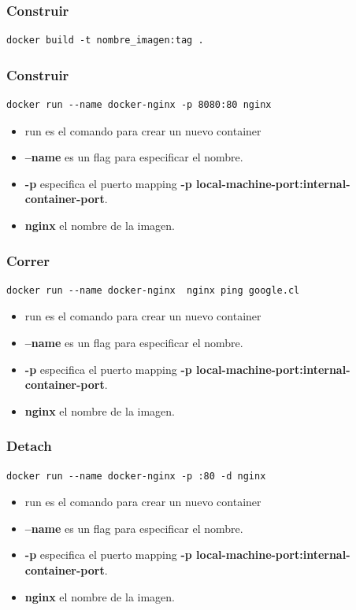 \documentclass[compress]{beamer}
\begin{document}
\begin{frame}[fragile]
\frametitle{Construir}
\begin{lstlisting}
docker build -t nombre_imagen:tag .
\end{lstlisting}
\end{frame}

\begin{frame}[fragile]
\frametitle{Construir}
\begin{lstlisting}
docker run --name docker-nginx -p 8080:80 nginx
\end{lstlisting}
\begin{itemize}
	\item run es el comando para crear un nuevo container
	\item \textbf{--name} es un flag para especificar el nombre.
	\item \textbf{-p} especifica el puerto mapping \textbf{-p local-machine-port:internal-container-port}.
	\item \textbf{nginx} el nombre de la imagen.
\end{itemize}
\end{frame}


\begin{frame}[fragile]
\frametitle{Correr}
\begin{lstlisting}
docker run --name docker-nginx  nginx ping google.cl
\end{lstlisting}
\begin{itemize}
	\item run es el comando para crear un nuevo container
	\item \textbf{--name} es un flag para especificar el nombre.
	\item \textbf{-p} especifica el puerto mapping \textbf{-p local-machine-port:internal-container-port}.
	\item \textbf{nginx} el nombre de la imagen.
\end{itemize}
\end{frame}


\begin{frame}[fragile]
\frametitle{Detach}
\begin{lstlisting}
docker run --name docker-nginx -p :80 -d nginx
\end{lstlisting}
\begin{itemize}
	\item run es el comando para crear un nuevo container
	\item \textbf{--name} es un flag para especificar el nombre.
	\item \textbf{-p} especifica el puerto mapping \textbf{-p local-machine-port:internal-container-port}.
	\item \textbf{nginx} el nombre de la imagen.
\end{itemize}
\end{frame}
\end{document}
